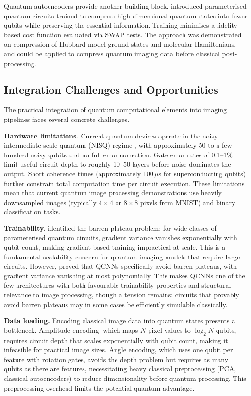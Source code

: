 Quantum autoencoders provide another building block. \citet{romero2017} introduced parameterised quantum circuits trained to compress high-dimensional quantum states into fewer qubits while preserving the essential information. Training minimises a fidelity-based cost function evaluated via SWAP tests. The approach was demonstrated on compression of Hubbard model ground states and molecular Hamiltonians, and could be applied to compress quantum imaging data before classical post-processing.

\subsection{Integration Challenges and Opportunities}

The practical integration of quantum computational elements into imaging pipelines faces several concrete challenges.

\textbf{Hardware limitations.} Current quantum devices operate in the noisy intermediate-scale quantum (NISQ) regime \citep{preskill2018}, with approximately 50 to a few hundred noisy qubits and no full error correction. Gate error rates of 0.1--1\% limit useful circuit depth to roughly 10--50 layers before noise dominates the output. Short coherence times (approximately 100\,$\mu$s for superconducting qubits) further constrain total computation time per circuit execution. These limitations mean that current quantum image processing demonstrations use heavily downsampled images (typically $4 \times 4$ or $8 \times 8$ pixels from MNIST) and binary classification tasks.

\textbf{Trainability.} \citet{mcclean2018} identified the barren plateau problem: for wide classes of parameterised quantum circuits, gradient variance vanishes exponentially with qubit count, making gradient-based training impractical at scale. This is a fundamental scalability concern for quantum imaging models that require large circuits. However, \citet{pesah2021} proved that QCNNs specifically avoid barren plateaus, with gradient variance vanishing at most polynomially. This makes QCNNs one of the few architectures with both favourable trainability properties and structural relevance to image processing, though a tension remains: circuits that provably avoid barren plateaus may in some cases be efficiently simulable classically.

\textbf{Data loading.} Encoding classical image data into quantum states presents a bottleneck. Amplitude encoding, which maps $N$ pixel values to $\log_2 N$ qubits, requires circuit depth that scales exponentially with qubit count, making it infeasible for practical image sizes. Angle encoding, which uses one qubit per feature with rotation gates, avoids the depth problem but requires as many qubits as there are features, necessitating heavy classical preprocessing (PCA, classical autoencoders) to reduce dimensionality before quantum processing. This preprocessing overhead limits the potential quantum advantage.

